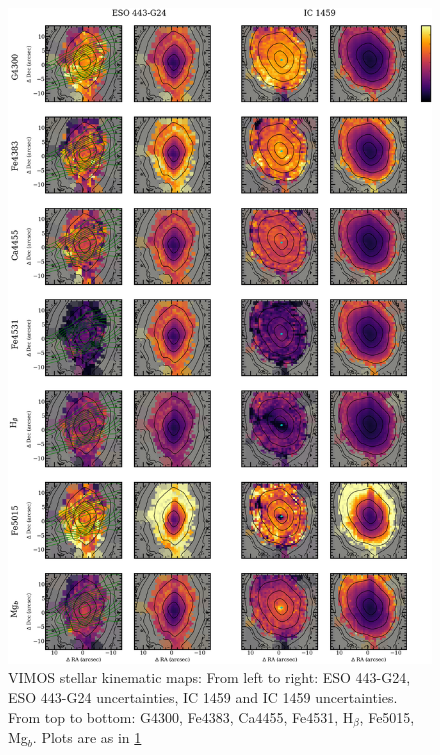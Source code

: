 		\begin{figure}
			\centering
			\includegraphics[height=0.94\textheight]{chapter4/vimos/abs1.png}
			\caption[VIMOS absorption line strength maps]{VIMOS stellar kinematic maps: From left to right: ESO 443-G24, ESO 443-G24 uncertainties, IC 1459 and IC 1459 uncertainties. From top to bottom: G4300, Fe4383, Ca4455, Fe4531, H$_\beta$, Fe5015, Mg$_b$. Plots are as in \ref{fig:VIMOS_absorption}}
			\label{fig:VIMOS_absorption}
		\end{figure}
